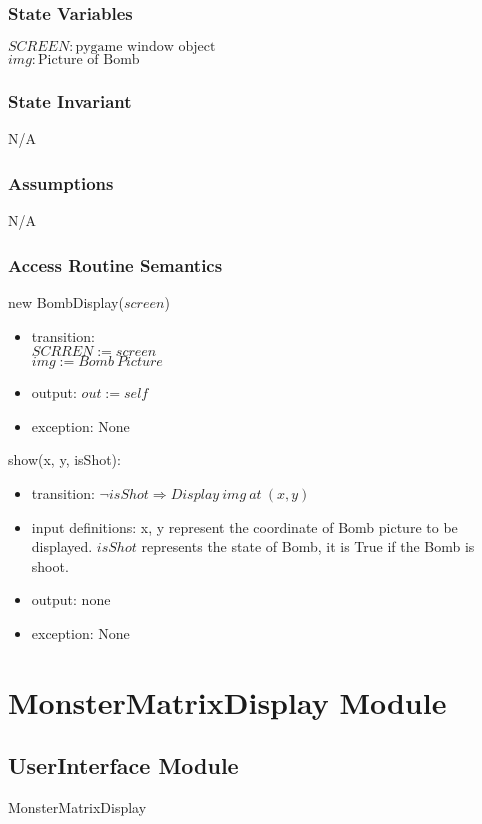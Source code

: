 \documentclass[12pt]{article}
\begin{document}
\subsubsection*{State Variables}
$SCREEN : \text{pygame window object}$\\
$img : \text{Picture of Bomb}$
\subsubsection*{State Invariant}
N/A
\subsubsection*{Assumptions}
N/A
\subsubsection*{Access Routine Semantics}

new BombDisplay($screen$)
\begin{itemize}
    \item transition:\\
    $SCRREN := screen$\\
    $img := Bomb\ Picture$
    \item output: $out := self$
    \item exception: None
\end{itemize}

\noindent show(x, y, isShot):
\begin{itemize}
    \item transition: $\lnot isShot \Rightarrow Display\ img\ at\ (x, y)$
    \item input definitions: x, y represent the coordinate of Bomb
    picture
     to be displayed. $isShot$ represents the state of Bomb, it is True if the Bomb is shoot.
    \item output: none
    \item exception: None
\end{itemize}
\newpage

\section{MonsterMatrixDisplay Module}

\subsection*{UserInterface Module}
MonsterMatrixDisplay
\end{document}
